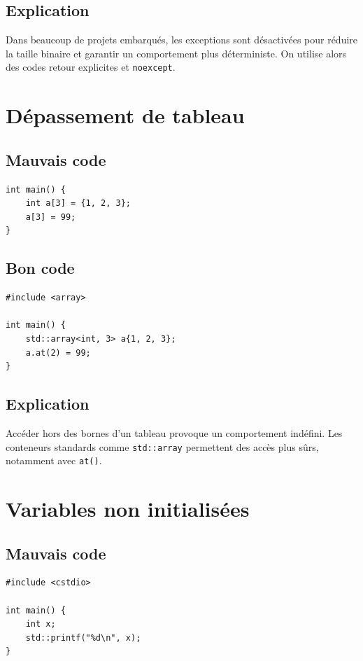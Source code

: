 \documentclass[a4paper,11pt]{report}
\begin{document}
\section{Explication}
Dans beaucoup de projets embarqués, les exceptions sont désactivées pour réduire la taille binaire et garantir un comportement plus déterministe.
On utilise alors des codes retour explicites et \texttt{noexcept}.

\chapter{Dépassement de tableau}

\section{Mauvais code}
\begin{lstlisting}
int main() {
    int a[3] = {1, 2, 3};
    a[3] = 99;
}
\end{lstlisting}

\section{Bon code}
\begin{lstlisting}
#include <array>

int main() {
    std::array<int, 3> a{1, 2, 3};
    a.at(2) = 99;
}
\end{lstlisting}

\section{Explication}
Accéder hors des bornes d'un tableau provoque un comportement indéfini.
Les conteneurs standards comme \texttt{std::array} permettent des accès plus sûrs, notamment avec \texttt{at()}.

\chapter{Variables non initialisées}

\section{Mauvais code}
\begin{lstlisting}
#include <cstdio>

int main() {
    int x;
    std::printf("%d\n", x);
}
\end{lstlisting}
\end{document}
